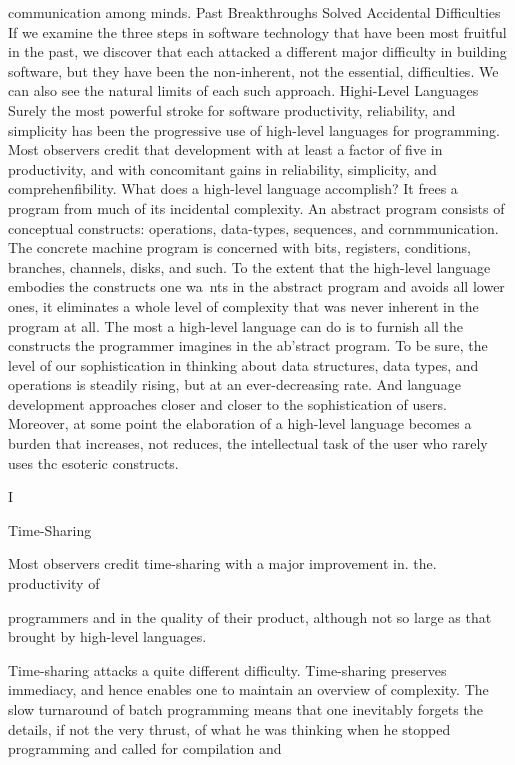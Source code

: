 \documentclass[12pt]{article}
\begin{document}
communication among minds.
Past Breakthroughs Solved Accidental Difficulties
If we examine the three steps in software technology that have been most fruitful in
the past, we discover that each attacked a different major difficulty in building software,
but they have been the non-inherent, not the essential, difficulties. We can also see the
natural limits of each such approach.
Highi-Level Languages
Surely the most powerful stroke for software productivity, reliability, and simplicity has
been the progressive use of high-level languages for programming. Most observers credit
that development with at least a factor of five in productivity, and with concomitant gains
in reliability, simplicity, and comprehenfibility.
What does a high-level language accomplish? It frees a program from much of its
incidental complexity. An abstract program consists of conceptual constructs: operations,
data-types, sequences, and cornmmunication. The concrete machine program is concerned
with bits, registers, conditions, branches, channels, disks, and such. To the extent that
the high-level language embodies the constructs one wa~nts in the abstract program and
avoids all lower ones, it eliminates a whole level of complexity that was never inherent in
the program at all.
The most a high-level language can do is to furnish all the constructs the programmer imagines in the ab'stract program. To be sure, the level of our sophistication in
thinking about data structures, data types, and operations is steadily rising, but at an
ever-decreasing rate. And language development approaches closer and closer to the
sophistication of users.
Moreover, at some point the elaboration of a high-level language becomes a burden
that increases, not reduces, the intellectual task of the user who rarely uses thc esoteric
constructs.

I

Time-Sharing

Most observers credit time-sharing with a major improvement in. the. productivity of

programmers and in the quality of their product, although not so large as that brought by
high-level languages.

Time-sharing attacks a quite different difficulty. Time-sharing preserves immediacy,
and hence enables one to maintain an overview of complexity. The slow turnaround of
batch programming means that one inevitably forgets the details, if not the very thrust,
of what he was thinking when he stopped programming and called for compilation and
\end{document}

